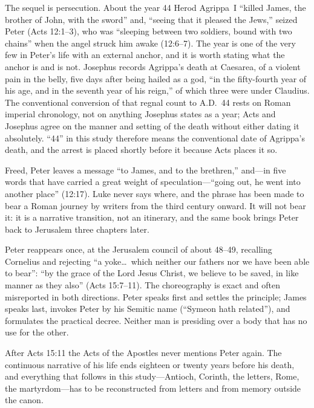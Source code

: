 The sequel is persecution. About the year 44 Herod Agrippa~I ``killed James,
the brother of John, with the sword'' and, ``seeing that it pleased the
Jews,'' seized Peter (Acts 12:1--3), who was ``sleeping between two soldiers,
bound with two chains'' when the angel struck him awake (12:6--7). The year
is one of the very few in Peter's life with an external anchor, and it is
worth stating what the anchor is and is not. Josephus records Agrippa's death
at Caesarea, of a violent pain in the belly, five days after being hailed as
a god, ``in the fifty-fourth year of his age, and in the seventh year of his
reign,'' of which three were under Claudius. The conventional conversion of
that regnal count to A.D.~44 rests on Roman imperial chronology, not on
anything Josephus states as a year; Acts and Josephus agree on the manner and
setting of the death without either dating it absolutely. ``44'' in this
study therefore means the conventional date of Agrippa's death, and the
arrest is placed shortly before it because Acts places it so.

Freed, Peter leaves a message ``to James, and to the brethren,'' and---in
five words that have carried a great weight of speculation---``going out, he
went into another place'' (12:17). Luke never says where, and the phrase has
been made to bear a Roman journey by writers from the third century onward.
It will not bear it: it is a narrative transition, not an itinerary, and the
same book brings Peter back to Jerusalem three chapters later.

Peter reappears once, at the Jerusalem council of about 48--49, recalling
Cornelius and rejecting ``a yoke\ldots\ which neither our fathers nor we have
been able to bear'': ``by the grace of the Lord Jesus Christ, we believe to
be saved, in like manner as they also'' (Acts 15:7--11). The choreography is
exact and often misreported in both directions. Peter speaks first and
settles the principle; James speaks last, invokes Peter by his Semitic name
(``Symeon hath related''), and formulates the practical decree. Neither man
is presiding over a body that has no use for the other.

After Acts 15:11 the Acts of the Apostles never mentions Peter again. The
continuous narrative of his life ends eighteen or twenty years before his
death, and everything that follows in this study---Antioch, Corinth, the
letters, Rome, the martyrdom---has to be reconstructed from letters and from
memory outside the canon.
